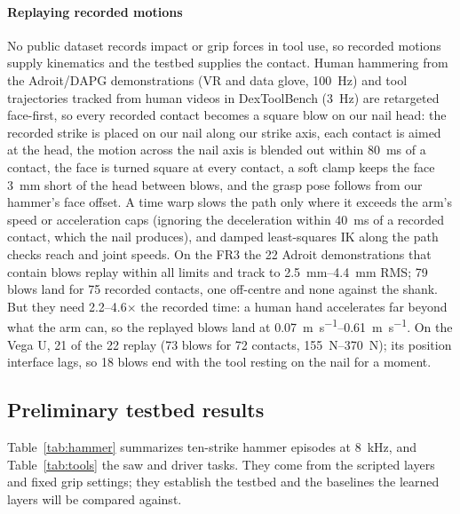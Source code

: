 \paragraph{Replaying recorded motions} No public dataset records impact or grip forces in tool use, so recorded
motions supply kinematics and the testbed supplies the contact. Human hammering from the Adroit/DAPG demonstrations
(VR and data glove, \SI{100}{\hertz}) and tool trajectories tracked from human videos in DexToolBench
(\SI{3}{\hertz}) are retargeted face-first, so every recorded contact becomes a square blow on our nail head: the
recorded strike is placed on our nail along our strike axis, each contact is aimed at the head, the motion across the
nail axis is blended out within \SI{80}{\milli\second} of a contact, the face is turned square at every contact, a
soft clamp keeps the face \SI{3}{\milli\metre} short of the head between blows, and the grasp pose follows from our
hammer's face offset. A time warp slows the path only where it exceeds the arm's speed or acceleration caps (ignoring
the deceleration within \SI{40}{\milli\second} of a recorded contact, which the nail produces), and damped
least-squares IK along the path checks reach and joint speeds. On the FR3 the 22 Adroit demonstrations that contain
blows replay within all limits and track to \SIrange{2.5}{4.4}{\milli\metre} RMS; 79 blows land for 75 recorded
contacts, one off-centre and none against the shank. But they need 2.2--4.6$\times$ the recorded time: a human hand
accelerates far beyond what the arm can, so the replayed blows land at \SIrange{0.07}{0.61}{\metre\per\second}. On
the Vega U, 21 of the 22 replay (73 blows for 72 contacts, \SIrange{155}{370}{\newton}); its position interface lags,
so 18 blows end with the tool resting on the nail for a moment.

\subsection{Preliminary testbed results}
Table~\ref{tab:hammer} summarizes ten-strike hammer episodes at \SI{8}{\kilo\hertz}, and Table~\ref{tab:tools}
the saw and driver tasks. They come from the scripted layers and fixed grip settings; they establish the testbed and
the baselines the learned layers will be compared against.

